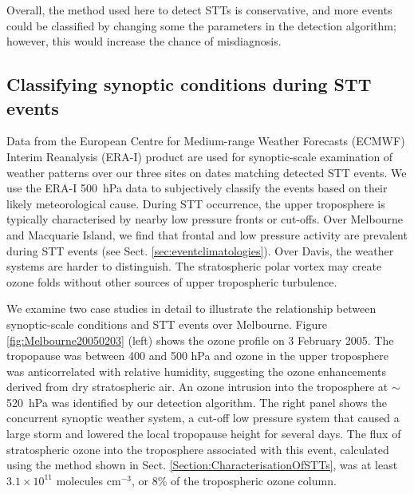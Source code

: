 \documentclass[acp, manuscript]{copernicus} %
\begin{document}
    Overall, the method used here to detect STTs is conservative, and more events could be classified by changing some the parameters in the detection algorithm; however, this would increase the chance of misdiagnosis. 

  \subsection{Classifying synoptic conditions during STT events}
  \label{Section:WeatherClassifications}
    Data from the European Centre for Medium-range Weather Forecasts (ECMWF) Interim Reanalysis (ERA-I) \citep{Dee2011} product are used for synoptic-scale examination of weather patterns over our three sites on dates matching detected STT events.
    We use the ERA-I 500~hPa data to subjectively classify the events based on their likely meteorological cause.
    During STT occurrence, the upper troposphere is typically characterised by nearby low pressure fronts or cut-offs.
    Over Melbourne and Macquarie Island, we find that frontal and low pressure activity are prevalent during STT events (see Sect. \ref{sec:eventclimatologies}).
    Over Davis, the weather systems are harder to distinguish. The stratospheric polar vortex may create ozone folds without other sources of upper tropospheric turbulence.

    We examine two case studies in detail to illustrate the relationship between synoptic-scale conditions and STT events  over Melbourne.
    Figure \ref{fig:Melbourne20050203} (left) shows the ozone profile on 3 February 2005.
    The tropopause was between 400 and 500 hPa and ozone in the upper troposphere was anticorrelated with relative humidity, suggesting the ozone enhancements derived from dry stratospheric air. 
    An ozone intrusion into the troposphere at $\sim$520~hPa was identified by our detection algorithm.
    The right panel shows the concurrent synoptic weather system, a cut-off low pressure system that caused a large storm and lowered the local tropopause height for several days.
    The flux of stratospheric ozone into the troposphere associated with this event, calculated using the method shown in Sect. \ref{Section:CharacterisationOfSTTs}, was at least $3.1 \times 10^{11}$ molecules cm$^{-3}$, or 8\% of the tropospheric ozone column.
\end{document}
